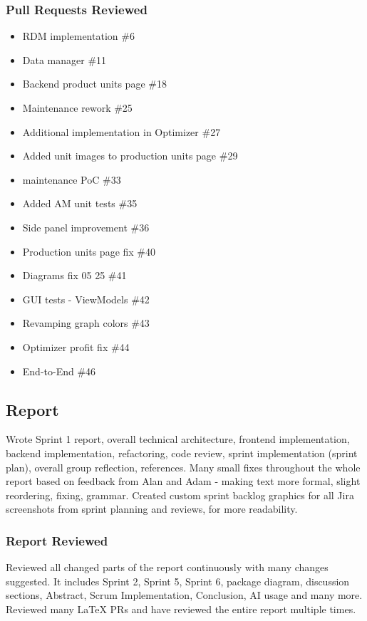 \subsubsection*{Pull Requests Reviewed}
\begin{itemize}
    \item RDM implementation \#6
    \item Data manager \#11
    \item Backend product units page \#18
    \item Maintenance rework \#25
    \item Additional implementation in Optimizer \#27
    \item Added unit images to production units page \#29
    \item maintenance PoC \#33
    \item Added AM unit tests \#35
    \item Side panel improvement \#36
    \item Production units page fix \#40
    \item Diagrams fix 05 25 \#41
    \item GUI tests - ViewModels \#42
    \item Revamping graph colors \#43
    \item Optimizer profit fix \#44
    \item End-to-End \#46

\end{itemize}
\subsection*{Report}
Wrote Sprint 1 report, overall technical architecture, frontend implementation, backend implementation, refactoring, code review, sprint implementation (sprint plan), overall group reflection, references. \newline \newline
Many small fixes throughout the whole report based on feedback from Alan and Adam - making text more formal, slight reordering, fixing, grammar. Created custom sprint backlog graphics for all Jira screenshots from sprint planning and reviews, for more readability.
\subsubsection*{Report Reviewed}
Reviewed all changed parts of the report continuously with many changes suggested. It includes Sprint 2, Sprint 5, Sprint 6, package diagram, discussion sections, Abstract, Scrum Implementation, Conclusion, AI usage and many more. Reviewed many LaTeX PRs and have reviewed the entire report multiple times.
